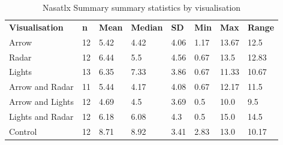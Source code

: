 \begin{table}[]
\caption{Nasatlx Summary summary statistics by visualisation}
\label{tab:NasaTLX_Summary}
\begin{tabular}{llllllll}
\textbf{Visualisation} & \textbf{n} & \textbf{Mean} & \textbf{Median} & \textbf{SD} & \textbf{Min} & \textbf{Max} & \textbf{Range} \\
Arrow                  & 12         & 5.42          & 4.42            & 4.06        & 1.17         & 13.67        & 12.5 \\
Radar                  & 12         & 6.44          & 5.5             & 4.56        & 0.67         & 13.5         & 12.83 \\
Lights                 & 13         & 6.35          & 7.33            & 3.86        & 0.67         & 11.33        & 10.67 \\
Arrow and Radar        & 11         & 5.44          & 4.17            & 4.08        & 0.67         & 12.17        & 11.5 \\
Arrow and Lights       & 12         & 4.69          & 4.5             & 3.69        & 0.5          & 10.0         & 9.5 \\
Lights and Radar       & 12         & 6.18          & 6.08            & 4.3         & 0.5          & 15.0         & 14.5 \\
Control                & 12         & 8.71          & 8.92            & 3.41        & 2.83         & 13.0         & 10.17
\end{tabular}
\end{table}
